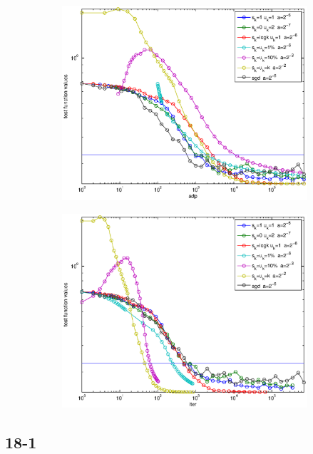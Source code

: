 \documentclass[12pt]{article}
\begin{document}
	\begin{figure}[H]
	\begin{subfigure}[b]{.5\linewidth}
		        \includegraphics[width=4in]{GenFigures/16-2c-1.eps}
	\end{subfigure}%
	\begin{subfigure}[b]{.5\linewidth}
		        \includegraphics[width=4in]{GenFigures/16-2c-2.eps}
	\end{subfigure}%

	\end{figure}
	
	
	\subsection{18-1}
\end{document}
